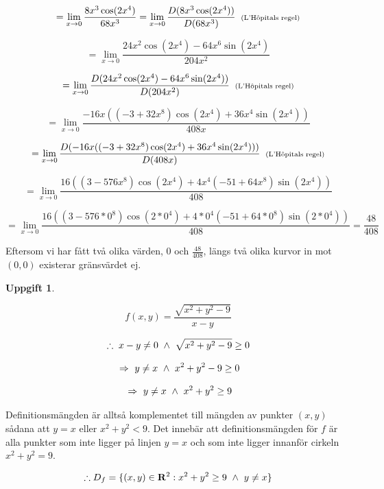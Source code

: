 \documentclass{article}
\newtheorem{thr}{Uppgift}
\begin{document}
\begin{enumerate}
        $$
        =
        \lim_{x\to0}{\frac{8x^3\cos(2x^4)}{68x^3}}
        =
        \lim_{x\to0}{\frac{D(8x^3\cos(2x^4))}{D(68x^3)}} \;\; \text{\scriptsize(L'Hôpitals regel)}
        $$

        $$
        =
        \lim_{x\to0}{\frac{24x^2\cos(2x^4)-64x^6\sin(2x^4)}{204x^2}}
        $$

        $$
        =
        \lim_{x\to0}{\frac{D(24x^2\cos(2x^4)-64x^6\sin(2x^4))}{D(204x^2)}} \;\; \text{\scriptsize(L'Hôpitals regel)}
        $$

        $$
        =
        \lim_{x\to0}{\frac{-16x((-3+32x^8)\cos(2x^4)+36x^4\sin(2x^4))}{408x}}
        $$

        $$
        =
        \lim_{x\to0}{\frac{D(-16x((-3+32x^8)\cos(2x^4)+36x^4\sin(2x^4)))}{D(408x)}} \;\; \text{\scriptsize(L'Hôpitals regel)}
        $$

        $$
        =
        \lim_{x\to0}{\frac{16((3-576x^8)\cos(2x^4)+4x^4(-51+64x^8)\sin(2x^4))}{408}}
        $$

        $$
        =
        \lim_{x\to0}{\frac{16((3-576*0^8)\cos(2*0^4)+4*0^4(-51+64*0^8)\sin(2*0^4))}{408}}
        =
        \frac{48}{408}
        $$

        \vskip 0.2cm

        Eftersom vi har fått två olika värden, 0 och $\frac{48}{408}$, längs två olika kurvor in mot $(0, 0)$ existerar gränsvärdet ej.
\end{enumerate}

\newpage

\begin{thr}
\end{thr}

$$
f(x, y)=\frac{\sqrt{x^2+y^2-9}}{x-y}
$$

$$
\therefore\; x-y\neq0 \Och \sqrt{x^2+y^2-9}\geq0
$$

$$
\Imp
y\neq x \Och x^2+y^2-9\geq0
$$

$$
\Imp
y\neq x \Och x^2+y^2\geq9
$$

\vskip 0.2cm

Definitionsmängden är alltså komplementet till mängden av punkter $(x, y)$ sådana att $y=x$ eller $x^2+y^2<9$. Det innebär att definitionsmängden för $f$ är alla punkter som inte ligger på linjen $y=x$ och som inte ligger innanför cirkeln $x^2+y^2=9$.

$$
\therefore D_{f}=\{(x, y)\in \R^2: x^2+y^2\geq9 \Och y\neq x\}
$$

\vskip 0.2cm
\end{document}
